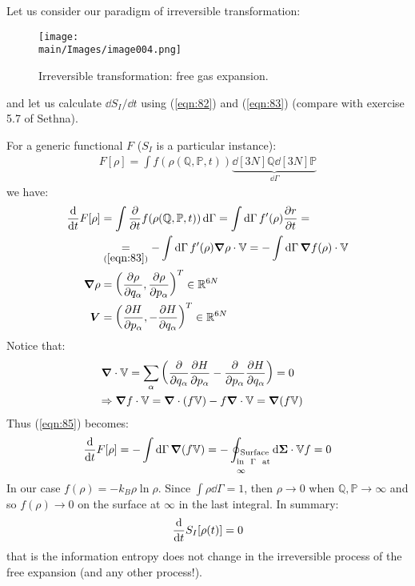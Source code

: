 \documentclass[../../main.tex]{subfiles}
\begin{document}
\medskip

Let us consider our paradigm of irreversible transformation:

\begin{figure}[H]
    \centering
    \texttt{[image: \\main/Images/image004.png]}
    \caption{Irreversible transformation: free gas expansion.\label{fig:irrev}}
\end{figure}
and let us calculate $\dd{S_I}/\dd{t}$ using (\ref{eqn:82}) and (\ref{eqn:83}) (compare with exercise 5.7 of Sethna).

For a generic functional $F$ ($S_I$ is a particular instance):
\begin{align}\label{eqn:84}
    F[\rho] = \int f(\rho(\mathbb{Q}, \mathbb{P}, t)) \underbrace{\dd[3N]{\mathbb{Q}} \dd[3N]{\mathbb{P}}}_{\dd{\Gamma}} 
\end{align}
we have:
\begin{align}\label{eqn:85}
    \dv{t} F[\rho] &= \int \pdv{t} f(\rho(\mathbb{Q}, \mathbb{P},t)) \dd{\Gamma} = \int \dd{\Gamma} f'(\rho) \pdv{r}{t} =\\ \nonumber
    &\underset{(\ref{eqn:83})}{=} -\int \dd{\Gamma} f'(\rho) \grad \rho \cdot \mathbb{V} = -\int \dd{\Gamma} \grad f(\rho) \cdot \mathbb{V}\\
    \grad \rho &= \left(\pdv{\rho}{q_\alpha}, \pdv{\rho}{p_\alpha}\right)^T \in \mathbb{R}^{6N} \label{eqn:86}\\
    \bm{V} &= \left(\pdv{H}{p_\alpha}, -\pdv{H}{q_\alpha}\right)^T \in \mathbb{R}^{6N} \label{eqn:87}
\end{align}
Notice that:
\begin{align}\label{eqn:88}
    \grad \cdot \bm{\mathbb{V}} = \sum_\alpha \left(\pdv{q_\alpha} \pdv{H}{p_\alpha} - \pdv{p_\alpha} \pdv{H}{q_\alpha}\right) = 0 \\
    \Rightarrow \grad f \cdot \bm{\mathbb{V}} = \grad \cdot (f \bm{\mathbb{V}}) - f \grad \cdot \bm{\mathbb{V}} = \grad (f \bm{\mathbb{V}}) \span \label{eqn:89}
\end{align}
Thus (\ref{eqn:85}) becomes:
\begin{align}\label{eqn:90}
    \dv{t} F[\rho] = -\int \dd{\Gamma} \grad (f \bm{\mathbb{V}}) = - \oint_{\parbox{3em}{$\,\,$\scriptsize Surface in $\Gamma$ at $\infty$}} \dd{\bm{\Sigma}} \cdot \bm{\mathbb{V}} f = 0
\end{align}
In our case $f(\rho) = -k_B \rho \ln \rho$. Since $\int \rho \dd{\Gamma} = 1$, then $\rho \to 0$ when $\mathbb{Q}, \mathbb{P} \to \infty$ and so $f(\rho) \to 0$ on the surface at $\infty$ in the last integral. In summary:
\begin{align}\label{eqn:91}
    \dv{t} S_I[\rho(t)] = 0
\end{align}
that is the information entropy does not change in the irreversible process of the free expansion (and any other process!). 
\end{document}
